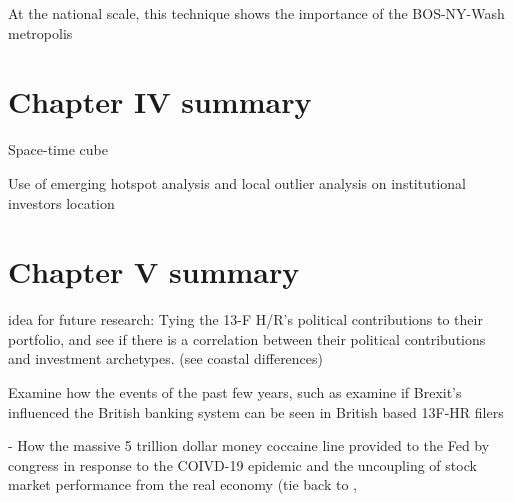 At the national scale, this technique shows the importance of the BOS-NY-Wash metropolis 
     

  



\section{Chapter IV summary}

Space-time cube

Use of emerging hotspot analysis and local outlier analysis on institutional investors location



\section{Chapter V summary}


idea for future research: Tying the 13-F H/R's political contributions to their portfolio, and see if there is a correlation between their political contributions and investment archetypes. (see coastal differences) 

Examine how the events of the past few years, such as examine if Brexit's influenced the British banking system can be seen in British based 13F-HR filers

- How the massive 5 trillion dollar money coccaine line provided to the Fed by congress in response to the COIVD-19 epidemic and the uncoupling of stock market performance from the real economy (tie back to , 